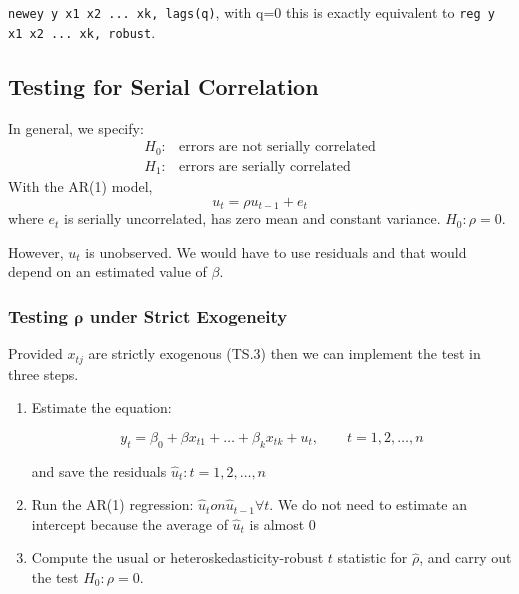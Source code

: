 \documentclass[11pt]{article}
\begin{document}
\lstinline{newey y x1 x2 ... xk, lags(q)}, with q=0 this is exactly equivalent to \lstinline{reg y x1 x2 ... xk, robust}.

\subsection{Testing for Serial Correlation}

\begin{shaded}
    In general, we specify:
    \begin{align*}
        H_0:& \text {errors are not serially correlated} \\
        H_1:& \text {errors are serially correlated}
    \end{align*}
    With the AR(1) model,
    \[u_t = \rho u_{t-1} + e_t\]
    where $e_t$ is serially uncorrelated, has zero mean and constant variance. $H_0: \rho = 0$.
\end{shaded}

However, $u_t$ is unobserved. We would have to use residuals and that would depend on an estimated value of $\beta$.

\subsubsection{Testing $\boldsymbol{\rho}$ under Strict Exogeneity}

Provided $x_{tj}$ are strictly exogenous (TS.3) then we can implement the test in three steps.

\begin{mdframed}
    \begin{enumerate}
        \item Estimate the equation:
        
        \[y_t = \beta_0 + \beta x_{t1} + \ldots + \beta_k x_{tk} + u_t, \qquad t=1,2,\ldots,n\]
        
        and save the residuals $\hat{u}_t: t=1,2,\ldots,n$

        \item Run the AR(1) regression: $\hat{u}_t on \hat{u}_{t-1} \forall t$. We do not need to estimate an intercept because the average of $\hat{u}_t$ is almost 0

        \item Compute the usual or heteroskedasticity-robust $t$ statistic for $\hat{\rho}$, and carry out the test $H_0: \rho = 0$.
    \end{enumerate}
\end{mdframed}
\end{document}
